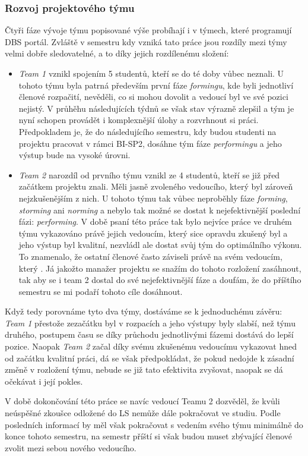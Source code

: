 \subsubsection{Rozvoj projektového týmu}
Čtyři fáze vývoje týmu popisované výše probíhají i v týmech, které programují DBS portál. Zvláště v semestru kdy vzniká tato práce jsou rozdíly mezi týmy velmi dobře sledovatelné, a to díky jejich rozdílenému složení:
\begin{itemize}
	\item \emph{Team 1} vznikl spojením 5 studentů, kteří se do té doby vůbec neznali. U tohoto týmu byla patrná především první fáze \emph{formingu}, kde byli jednotliví členové rozpačití, nevěděli, co si mohou dovolit a vedoucí byl ve své pozici nejistý. V průhěhu následujících týdnů se však stav výrazně zlepšil a tým je nyní schopen provádět i komplexnější úlohy a rozvrhnout si práci. Předpokladem je, že do následujícího semestru, kdy budou studenti na projektu pracovat v rámci BI-SP2, dosáhne tým fáze \emph{performingu} a jeho výstup bude na vysoké úrovni.
	\item \emph{Team 2} narozdíl od prvního týmu vznikl ze 4 studentů, kteří se již před začátkem projektu znali. Měli jasně zvoleného vedoucího, který byl zároveň nejzkušenějším z nich. U tohoto týmu tak vůbec neproběhly fáze \emph{forming}, \emph{storming} ani \emph{norming} a nebylo tak možné se dostat k nejefektivnější poslední fázi: \emph{performing}. V době psaní této práce tak bylo nejvíce práce ve druhém týmu vykazováno právě jejich vedoucím, který sice opravdu zkušený byl a jeho výstup byl kvalitní, nezvládl ale dostat svůj tým do optimálního výkonu. To znamenalo, že ostatní členové často záviseli právě na svém vedoucím, který . Já jakožto manažer projektu se snažím do tohoto rozložení zasáhnout, tak aby se i team 2 dostal do své nejefektivnější fáze a doufám, že do příštího semestru se mi podaří tohoto cíle dosáhnout.
\end{itemize}
Když tedy porovnáme tyto dva týmy, dostáváme se k jednoduchému závěru: \emph{Team 1} přestože zezačátku byl v rozpacích a jeho výstupy byly slabší, než týmu druhého, postupem času se díky průchodu jednotlivými fázemi dostává do lepší pozice. Naopak \emph{Team 2} začal díky svému zkušenému vedoucímu vykazovat hned od začátku kvalitní práci, dá se však předpokládat, že pokud nedojde k zásadní změně v rozložení týmu, nebude se již tato efektivita zvyšovat, naopak se dá očekávat i její pokles.

V době dokončování této práce se navíc vedoucí Teamu 2 dozvěděl, že kvůli neúspěšné zkoušce odložené do LS nemůže dále pokračovat ve studiu. Podle posledních informací by měl však pokračovat s vedením svého týmu minimálně do konce tohoto semestru, na semestr příští si však budou muset zbývající členové zvolit mezi sebou nového vedoucího.

